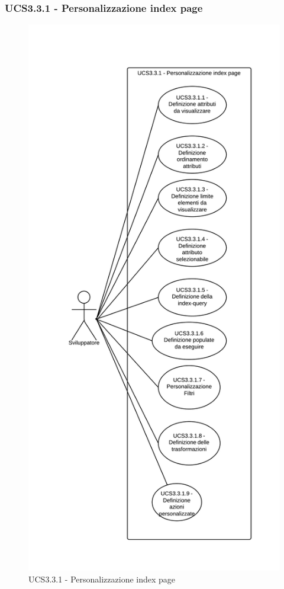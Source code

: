 \subsubsection{UCS3.3.1 - Personalizzazione index page} 
    \begin{figure}[H]
      \includegraphics[width=12cm]{UML/UCS3.3.1 - Personalizzazione index page.png}
      \caption{UCS3.3.1 - Personalizzazione index page} 
    \end{figure}
    
